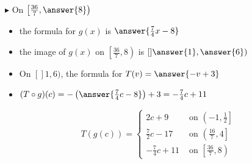 \documentclass{ximera}
\begin{document}
\begin{explanation}
$\blacktriangleright$ On $\left[ \frac{36}{7}, \answer{8} \right)$



\begin{itemize}

\item the formula for $g(x)$ is $\answer{\frac{7}{4}x - 8}$
\item the image of $g(x)$ on $\left[ \frac{36}{7}, 8 \right)$ is $\left[] \answer{1}, \answer{6} \right)$
\item On $[] 1, 6 )$, the formula for $T(v) = \answer{-v + 3}$  \\
\item $(T \circ g)(c) = -\left(\answer{\frac{7}{4}c - 8}\right) + 3 = -\frac{7}{4}c + 11$ \\


\end{itemize}

































\[
T(g(c)) = 
\begin{cases}
  2c +9                &       \text{ on }     \left(-1, \frac{1}{2}\right] \\
  \frac{7}{2}c - 17     &     \text{ on }  \left(\frac{16}{7}, 4\right] \\
  -\frac{7}{4}c + 11   &     \text{ on }  \left[\frac{36}{7}, 8\right)
\end{cases}
\]


  

\end{explanation}
\end{document}
